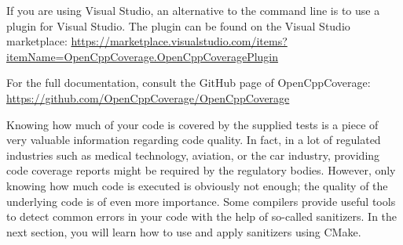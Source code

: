 If you are using Visual Studio, an alternative to the command line is to use a plugin for Visual Studio. The plugin can be found on the Visual Studio marketplace: \url{https://marketplace.visualstudio.com/items?itemName=OpenCppCoverage.OpenCppCoveragePlugin}

For the full documentation, consult the GitHub page of OpenCppCoverage:
\url{https://github.com/OpenCppCoverage/OpenCppCoverage}

Knowing how much of your code is covered by the supplied tests is a piece of very valuable information regarding code quality. In fact, in a lot of regulated industries such as medical technology, aviation, or the car industry, providing code coverage reports might be required by the regulatory bodies. However, only knowing how much code is executed is obviously not enough; the quality of the underlying code is of even more importance. Some compilers provide useful tools to detect common errors in your code with the help of so-called sanitizers. In the next section, you will learn how to use and apply sanitizers using CMake.

























